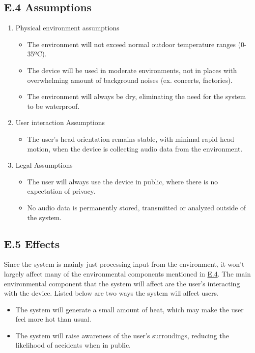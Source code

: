 \documentclass[12pt]{article}
\theoremstyle{definition}
\begin{document}
\subsection{E.4 Assumptions} \label{item: E.4}

\begin{enumerate}
  \item Physical environment assumptions
  \begin{itemize}
    \item The environment will not exceed normal outdoor temperature ranges
    (0-35ºC). 
    \item The device will be used in moderate environments, not in places with
    overwhelming amount of background noises (ex. concerts, factories).
    \item The environment will always be dry, eliminating the need for
    the system to be waterproof. 
  \end{itemize}

  \item User interaction Assumptions
  \begin{itemize}
    \item The user's head orientation remains stable, with minimal rapid
    head motion, when the device is collecting audio data from the environment. 
  \end{itemize}

  \item Legal Assumptions
  \begin{itemize}
    \item The user will always use the device in public, where there is no
    expectation of privacy. 
    \item No audio data is permanently stored, transmitted or analyzed outside
    of the system. 
  \end{itemize}
\end{enumerate}

\subsection{E.5 Effects}

Since the system is mainly just processing input from the environment, it won't
largely affect many of the environmental components mentioned in
\hyperref[item: E.4]{E.4}.
The main environmental component that the system will affect are the user's
interacting with the device. Listed below are two ways the system will affect
users.

\begin{itemize}
  \item The system will generate a small amount of heat, which may make the user
  feel more hot than usual. 
  \item The system will raise awareness of the user's surroudings, reducing the
  likelihood of accidents when in public. 
\end{itemize}
\end{document}
